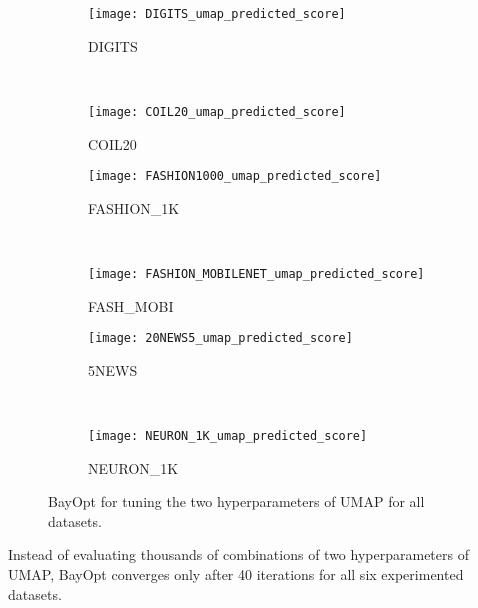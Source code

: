 \begin{figure}[ht!]
    \begin{subfigure}[b]{.48\linewidth}
        \centering
        \texttt{[image: DIGITS\_umap\_predicted\_score]}
        \caption{DIGITS}
        \label{fig:bo:umap:predict:DIGITS}
    \end{subfigure}
    ~
    \begin{subfigure}[b]{.48\linewidth}
        \centering
        \texttt{[image: COIL20\_umap\_predicted\_score]}
        \caption{COIL20}
        \label{fig:bo:umap:predict:COIL20}
    \end{subfigure}
    \vfill
    \begin{subfigure}[b]{.48\linewidth}
        \centering
        \texttt{[image: FASHION1000\_umap\_predicted\_score]}
        \caption{{FASHION\_1K}}
        \label{fig:bo:umap:predict:FASHION1K}
    \end{subfigure}
    ~
    \begin{subfigure}[b]{.48\linewidth}
        \centering
        \texttt{[image: FASHION\_MOBILENET\_umap\_predicted\_score]}
        \caption{{FASH\_MOBI}}
        \label{fig:bo:umap:predict:FASHMOBI}
    \end{subfigure}
    \vfill
    \begin{subfigure}[b]{.48\linewidth}
        \centering
        \texttt{[image: 20NEWS5\_umap\_predicted\_score]}
        \caption{5NEWS}
        \label{fig:bo:umap:predict:5NEWS}
    \end{subfigure}
    ~
    \begin{subfigure}[b]{.48\linewidth}
        \centering
        \texttt{[image: NEURON\_1K\_umap\_predicted\_score]}
        \caption{{NEURON\_1K}}
        \label{fig:bo:umap:predict:NEURON1K}
    \end{subfigure}
    \caption{BayOpt for tuning the two hyperparameters of UMAP for all datasets.}
    \label{fig:bo:umap:predict}
\end{figure}

Instead of evaluating thousands of combinations of two hyperparameters of UMAP, BayOpt converges only after 40 iterations for all six experimented datasets.



